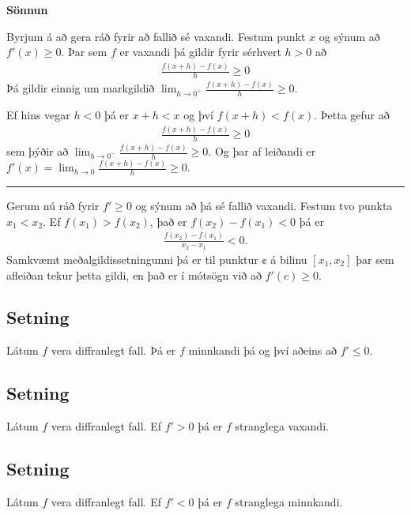 \documentclass[b5paper,11pt,icelandic]{sphinxmanual}
\begin{document}
\textbf{Sönnun}

Byrjum á að gera ráð fyrir að fallið sé vaxandi. Festum punkt \(x\) og
sýnum að \(f'(x)\geq 0\). Þar sem \(f\) er vaxandi þá gildir fyrir
sérhvert \(h>0\) að
\begin{equation*}
\begin{split}\frac{f(x+h)-f(x)}{h} \geq 0\end{split}
\end{equation*}
Þá gildir einnig um markgildið \(\lim_{h\to 0^+} \frac{f(x+h)-f(x)}h \geq 0\).

Ef hins vegar \(h<0\) þá er \(x+h < x\) og því
\(f(x+h)<f(x)\). Þetta gefur að
\begin{equation*}
\begin{split}\frac{f(x+h)-f(x)}h \geq 0\end{split}
\end{equation*}
sem þýðir að \(\lim_{h\to 0^-} \frac{f(x+h)-f(x)}h \geq 0\). Og þar af leiðandi
er \(f'(x) = \lim_{h\to 0} \frac{f(x+h)-f(x)}h \geq 0\).


\bigskip\hrule{}\bigskip


Gerum nú ráð fyrir \(f'\geq 0\) og sýnum að þá sé fallið vaxandi.
Festum tvo punkta \(x_1 < x_2\). Ef \(f(x_1) > f(x_2)\), það er
\(f(x_2)-f(x_1)<0\)
þá er
\begin{equation*}
\begin{split}\frac{f(x_2)-f(x_1)}{x_2-x_1} < 0.\end{split}
\end{equation*}
Samkvæmt meðalgildissetningunni þá er til punktur \(¢\) á bilinu \([x_1,x_2]\)
þar sem afleiðan tekur þetta gildi, en það er í mótsögn við að  \(f'(c)\geq 0\).


\subsection{Setning}
\label{kafli03:minnkandieoae}\label{kafli03:id16}
Látum \(f\) vera diffranlegt fall. Þá er \(f\) minnkandi þá og
því aðeins að \(f' \leq 0\).


\subsection{Setning}
\label{kafli03:id17}
Látum \(f\) vera diffranlegt fall. Ef \(f'>0\) þá er \(f\)
stranglega vaxandi.


\subsection{Setning}
\label{kafli03:id18}
Látum \(f\) vera diffranlegt fall. Ef \(f'<0\) þá er \(f\)
stranglega minnkandi.
\end{document}
